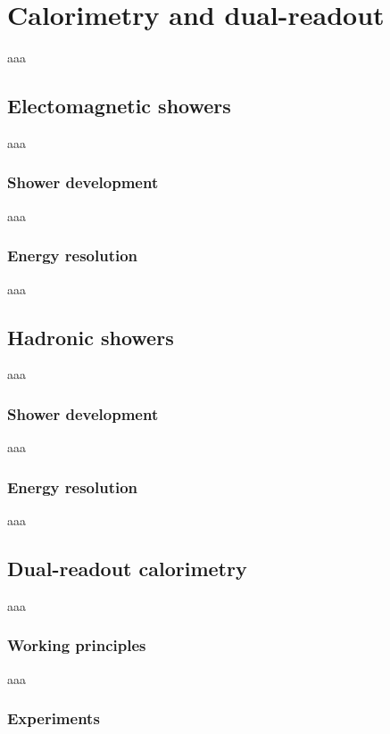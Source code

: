 \chapter{Calorimetry and dual-readout}
aaa

\section{Electomagnetic showers}
aaa

\subsection{Shower development}
aaa

\subsection{Energy resolution}
aaa

\section{Hadronic showers}
aaa

\subsection{Shower development}
aaa

\subsection{Energy resolution}
aaa

\section{Dual-readout calorimetry}
aaa

\subsection{Working principles}
aaa

\subsection{Experiments}